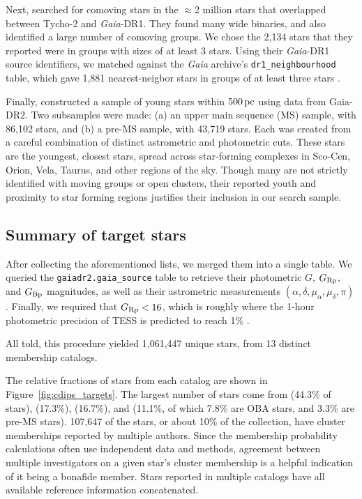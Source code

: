 \documentclass[12pt,twocolumn,tighten]{aastex62}
\begin{document}
Next, \citet{oh_comoving_2017} searched for comoving stars in the
$\approx$2 million stars that overlapped between Tycho-2 and {\it
Gaia}-DR1.  They found many wide binaries, and also identified a large
number of comoving groups.  We chose the 2{,}134 stars that they
reported were in groups with sizes of at least 3 stars.  Using their
{\it Gaia}-DR1 source identifiers, we matched against the {\it Gaia}
archive's \texttt{dr1\_neighbourhood} table, which gave 1{,}881
nearest-neigbor stars in groups of at least three stars
\citep{marrese_gaia_2019}.

Finally, \citet{zari_3d_2018} constructed a sample of young stars
within $500\,{\rm pc}$ using data from Gaia-DR2. Two subsamples were
made: (a) an upper main sequence (MS) sample, with 86{,}102 stars, and
(b) a pre-MS sample, with 43{,}719 stars.  Each was created from a
careful combination of distinct astrometric and photometric cuts.
These stars are the youngest, closest stars, spread across
star-forming complexes in Sco-Cen, Orion, Vela, Taurus, and other
regions of the sky.  Though many are not strictly identified with
moving groups or open clusters, their reported youth and proximity to star
forming regions justifies their inclusion in our search sample.




\subsection{Summary of target stars}
\label{subsec:ocmgsummary}


After collecting the aforementioned lists, we merged them into a
single table. We queried the \texttt{gaiadr2.gaia\_source} table to
retrieve their photometric $G$, $G_{\rm Rp}$, and $G_{\rm Bp}$
magnitudes, as well as their astrometric measurements $(\alpha,
\delta, \mu_\alpha, \mu_\delta, \pi)$.  Finally, we required that
$G_{\rm Rp} < 16$, which is roughly where the 1-hour photometric
precision of TESS is predicted to reach 1\%
\citep{ricker_transiting_2015}.

All told, this procedure yielded 1{,}061{,}447 unique stars, from 13
distinct membership catalogs.

The relative fractions of stars from each catalog are shown in
Figure~\ref{fig:cdips_targets}.
The largest number of stars come from \citealt{dias_proper_2014}
(44.3\% of stars), \citealt{Kharchenko_et_al_2013} (17.3\%),
\citealt{cantat-gaudin_gaia_2018} (16.7\%), and \citealt{zari_3d_2018}
(11.1\%, of which 7.8\% are OBA stars, and 3.3\% are pre-MS stars).
107{,}647 of the stars, or about 10\%
of the collection, have cluster memberships reported by multiple
authors.  Since the membership probability calculations often use
independent data and methods, agreement between multiple investigators
on a given star's cluster membership is a helpful indication of it
being a bonafide member.
Stars reported in multiple catalogs have all available reference information
concatenated.  
\end{document}
